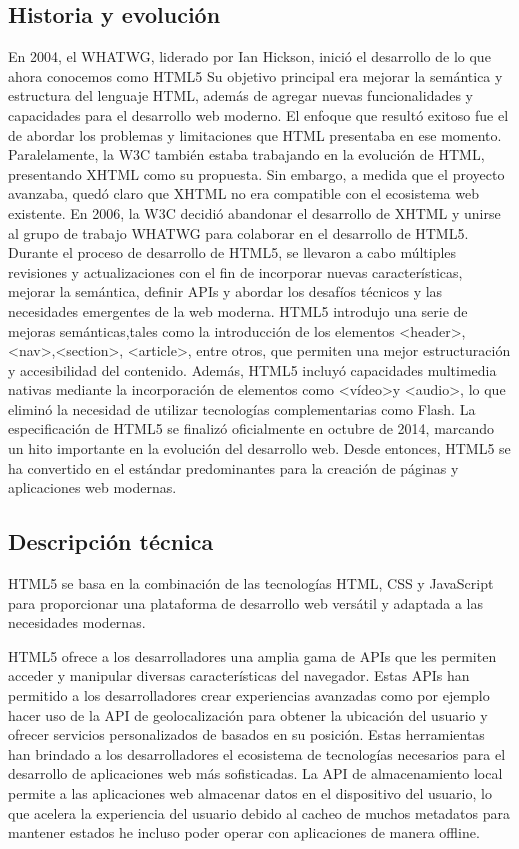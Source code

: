\documentclass[a4paper, 11pt]{book}
\begin{document}
\subsection{Historia y evolución}
En 2004, el WHATWG, liderado por Ian Hickson, inició el desarrollo de lo que ahora conocemos como HTML5  Su objetivo principal era mejorar la semántica y estructura del lenguaje HTML, además de agregar nuevas funcionalidades y capacidades para el desarrollo web moderno. El enfoque que resultó exitoso fue el de abordar los problemas y limitaciones que HTML presentaba en ese momento.
Paralelamente, la W3C también estaba trabajando en la evolución de HTML, presentando XHTML como su propuesta. Sin embargo, a medida que el proyecto avanzaba, quedó claro que XHTML no era compatible con el ecosistema web existente. 
En 2006, la W3C decidió abandonar el desarrollo de XHTML y unirse al grupo de trabajo WHATWG para colaborar en el desarrollo de HTML5.
Durante el proceso de desarrollo de HTML5, se llevaron a cabo múltiples revisiones y actualizaciones con el fin de incorporar nuevas características, mejorar la semántica, definir APIs y abordar los desafíos técnicos y las necesidades emergentes de la web moderna.
HTML5 introdujo una serie de mejoras semánticas,tales como la introducción de los elementos \textless header\textgreater ,\textless nav\textgreater,\textless section\textgreater, \textless article\textgreater, entre otros, que permiten una mejor estructuración y accesibilidad del contenido. Además, HTML5 incluyó capacidades multimedia nativas mediante la incorporación de elementos como \textless vídeo\textgreater y \textless audio\textgreater, lo que eliminó la necesidad de utilizar tecnologías complementarias como Flash.
La especificación de HTML5 se finalizó oficialmente en octubre de 2014, marcando un hito importante en la evolución del desarrollo web.
Desde entonces, HTML5 se ha convertido en el estándar predominantes para la creación de páginas y aplicaciones web modernas.
\subsection{Descripción técnica}
HTML5 se basa en la combinación de las tecnologías HTML, CSS y JavaScript para proporcionar una plataforma de desarrollo web versátil y adaptada a las necesidades modernas. 

HTML5 ofrece a los desarrolladores una amplia gama de APIs que les permiten acceder y manipular diversas características del navegador. Estas APIs han permitido a los desarrolladores crear experiencias avanzadas como por ejemplo hacer uso de la API de geolocalización para obtener la ubicación del usuario y ofrecer servicios personalizados de basados en su posición. Estas herramientas han brindado a los desarrolladores el ecosistema de tecnologías necesarios para el desarrollo de aplicaciones web más sofisticadas.
La API de almacenamiento local permite a las aplicaciones web almacenar datos en el dispositivo del usuario, lo que acelera la experiencia del usuario debido al cacheo de muchos metadatos para mantener estados he incluso poder operar con aplicaciones de manera offline.
\end{document}
